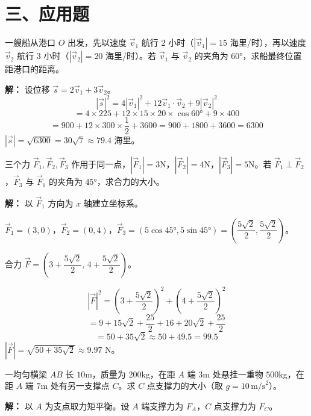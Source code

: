 \documentclass[12pt, a4paper]{ctexart}
\begin{document}
\section*{\textcolor{apppurple}{三、应用题}}

\begin{appbox}[【应用1】船航行问题]
一艘船从港口 $O$ 出发，先以速度 $\vec{v}_1$ 航行 $2$ 小时（$|\vec{v}_1|=15$ 海里/时），再以速度 $\vec{v}_2$ 航行 $3$ 小时（$|\vec{v}_2|=20$ 海里/时）。若 $\vec{v}_1$ 与 $\vec{v}_2$ 的夹角为 $60°$，求船最终位置距港口的距离。
\end{appbox}

\textbf{解：} 设位移 $\vec{s} = 2\vec{v}_1 + 3\vec{v}_2$。
\[
|\vec{s}|^2 = 4|\vec{v}_1|^2 + 12\vec{v}_1\cdot\vec{v}_2 + 9|\vec{v}_2|^2
\]
\[
= 4 \times 225 + 12 \times 15 \times 20 \times \cos 60° + 9 \times 400
\]
\[
= 900 + 12 \times 300 \times \frac{1}{2} + 3600 = 900 + 1800 + 3600 = 6300
\]
$|\vec{s}| = \sqrt{6300} = 30\sqrt{7} \approx 79.4$ 海里。

\begin{appbox}[【应用2】力学中的向量合成]
三个力 $\vec{F}_1, \vec{F}_2, \vec{F}_3$ 作用于同一点，$|\vec{F}_1|=3$N，$|\vec{F}_2|=4$N，$|\vec{F}_3|=5$N。若 $\vec{F}_1 \perp \vec{F}_2$，$\vec{F}_3$ 与 $\vec{F}_1$ 的夹角为 $45°$，求合力的大小。
\end{appbox}

\textbf{解：} 以 $\vec{F}_1$ 方向为 $x$ 轴建立坐标系。

$\vec{F}_1 = (3, 0)$，$\vec{F}_2 = (0, 4)$，$\vec{F}_3 = (5\cos 45°, 5\sin 45°) = \left(\dfrac{5\sqrt{2}}{2}, \dfrac{5\sqrt{2}}{2}\right)$。

合力 $\vec{F} = \left(3 + \dfrac{5\sqrt{2}}{2},\, 4 + \dfrac{5\sqrt{2}}{2}\right)$。

\[
|\vec{F}|^2 = \left(3+\frac{5\sqrt{2}}{2}\right)^2 + \left(4+\frac{5\sqrt{2}}{2}\right)^2
\]
\[
= 9 + 15\sqrt{2} + \frac{25}{2} + 16 + 20\sqrt{2} + \frac{25}{2}
\]
\[
= 50 + 35\sqrt{2} \approx 50 + 49.5 = 99.5
\]
$|\vec{F}| = \sqrt{50+35\sqrt{2}} \approx 9.97$ N。

\begin{appbox}[【应用3】结构力学中的支撑点]
一均匀横梁 $AB$ 长 $10$m，质量为 $200$kg，在距 $A$ 端 $3$m 处悬挂一重物 $500$kg，在距 $A$ 端 $7$m 处有另一支撑点 $C$。求 $C$ 点支撑力的大小（取 $g=10\,\text{m/s}^2$）。
\end{appbox}

\textbf{解：} 以 $A$ 为支点取力矩平衡。设 $A$ 端支撑力为 $F_A$，$C$ 点支撑力为 $F_C$。
\end{document}
